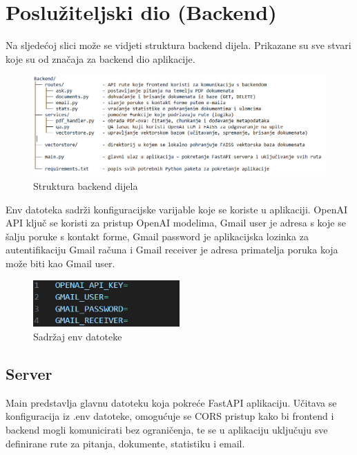 \documentclass[]{foi}
\begin{document}
\section{Poslužiteljski dio (Backend)}
Na sljedećoj slici može se vidjeti struktura backend dijela. Prikazane su sve stvari koje su od značaja za backend dio aplikacije.
\begin{figure}[ht!]
    \centering
    \includegraphics[width=1\textwidth]{./assets/backendstructure.png}
    \caption{Struktura backend dijela}
    \label{fig:slika111}
\end{figure}

Env datoteka sadrži konfiguracijske varijable koje se koriste u aplikaciji. OpenAI API ključ se koristi za pristup OpenAI modelima,
Gmail user je adresa s koje se šalju poruke s kontakt forme, Gmail password je aplikacijska lozinka za autentifikaciju Gmail računa i Gmail receiver
je adresa primatelja poruka koja može biti kao Gmail user.

\begin{figure}[h]
  \centering
  \includegraphics[width=0.5\textwidth]{./assets/env file.png}
  \caption{Sadržaj env datoteke}
  \label{fig:slika121}
\end{figure}


\subsection{Server}
Main predstavlja glavnu datoteku koja pokreće FastAPI aplikaciju. Učitava se konfiguracija iz .env datoteke, omogućuje se CORS pristup
kako bi frontend i backend mogli komunicirati bez ograničenja, te se u aplikaciju uključuju sve definirane rute za pitanja, dokumente, statistiku
i email. 
\end{document}
